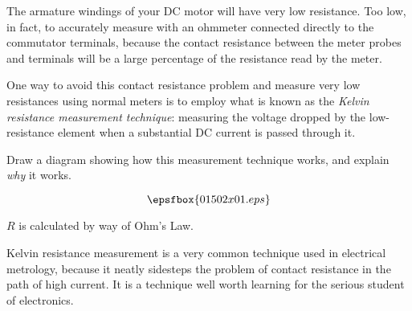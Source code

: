

The armature windings of your DC motor will have very low resistance.  Too low, in fact, to accurately measure with an ohmmeter connected directly to the commutator terminals, because the contact resistance between the meter probes and terminals will be a large percentage of the resistance read by the meter.  

One way to avoid this contact resistance problem and measure very low resistances using normal meters is to employ what is known as the {\it Kelvin resistance measurement technique}: measuring the voltage dropped by the low-resistance element when a substantial DC current is passed through it.

Draw a diagram showing how this measurement technique works, and explain {\it why} it works.







$$\epsfbox{01502x01.eps}$$

$R$ is calculated by way of Ohm's Law.







Kelvin resistance measurement is a very common technique used in electrical metrology, because it neatly sidesteps the problem of contact resistance in the path of high current.  It is a technique well worth learning for the serious student of electronics.




